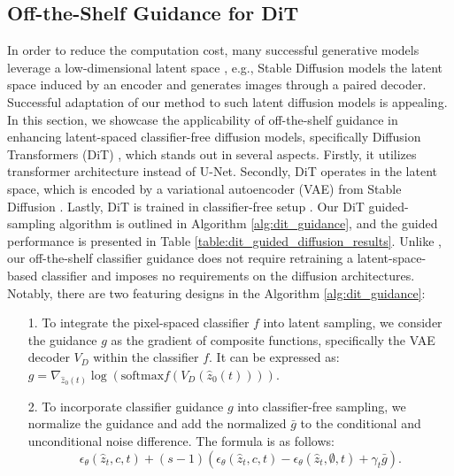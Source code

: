 \documentclass{article}
\theoremstyle{definition}
\begin{document}
\subsection{Off-the-Shelf Guidance for DiT}
In order to reduce the computation cost, many successful generative models leverage a low-dimensional latent space \citep{chang2022maskgit, vahdat2021score, hu2023complexity}, e.g., Stable Diffusion \citep{rombach2022high} models the latent space induced by an encoder and generates images through a paired decoder. 
Successful adaptation of our method to such latent diffusion models is appealing. 
In this section, we showcase the applicability of off-the-shelf guidance in enhancing latent-spaced classifier-free diffusion models, specifically Diffusion Transformers (DiT) \citep{peebles2022scalable}, which stands out in several aspects. Firstly, it utilizes transformer architecture instead of U-Net. Secondly, DiT operates in the latent space, which is encoded by a variational autoencoder (VAE) \citep{kingma2013auto} from Stable Diffusion \citep{rombach2022high}. Lastly, DiT is trained in classifier-free setup \citep{ho2022classifier}. Our DiT guided-sampling algorithm is outlined in Algorithm \ref{alg:dit_guidance}, and the guided performance is presented in Table \ref{table:dit_guided_diffusion_results}.
Unlike \cite{wallace2023end}, our off-the-shelf classifier guidance does not require retraining a latent-space-based classifier and imposes no requirements on the diffusion architectures.
Notably, there are two featuring designs in the Algorithm \ref{alg:dit_guidance}: 

\begin{enumerate}
    \item[1.]
To integrate the pixel-spaced classifier $f$ into latent sampling, we consider the guidance $g$ as the gradient of composite functions, specifically the VAE decoder $V_D$ within the classifier $f$. It can be expressed as:
$ g = \nabla_{\hat{z}_0(t)} \log(\text{softmax}f (V_D(\hat{z}_0(t)))) $.
\item[2.]
To incorporate classifier guidance $g$ into classifier-free sampling, we normalize the guidance and add the normalized $\bar{g}$ to the conditional and unconditional noise difference. The formula is as follows:
$$\epsilon_{\theta}(\hat{z}_t,c,t) + (s-1) (\epsilon_{\theta}(\hat{z}_t,c,t) - \epsilon_{\theta}(\hat{z}_t,\emptyset,t) + \gamma_t \bar{g}).$$
\end{enumerate}
\end{document}
